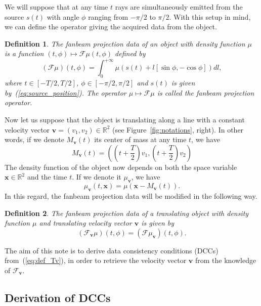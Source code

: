 \documentclass[twocolumn]{IEEEtran}
\numberwithin{equation}{section}
\newcommand{\R}{\mathbb{R}}
\newcommand{\bx}{\mathbf{x}}
\newcommand{\bv}{\mathbf{v}}
\newcommand{\Mbv}{M_{\mathbf{v}}}
\newcommand{\Tbv}{\mathcal{F}_{\mathbf{v}}}
\newcommand{\mubv}{\mu_{\mathbf{v}}}
\newtheorem{definition}{Definition}
\begin{document}
We will suppose that at any time $t$ rays are simultaneously emitted from the source $s(t)$ with angle $\phi$ ranging from $-\pi/2$ to $\pi/2$. With this setup in mind, we can define the operator giving the acquired data from the object.
\begin{definition}
The \emph{fanbeam projection data} of an object with density function $\mu$ is a function $(t,\phi) \mapsto \mathcal{F}\mu(t,\phi)$ defined by
\begin{equation}
	(\mathcal{F}\mu)(t,\phi) = \int_0^{+\infty} \mu \left( s(t) + l \left[ \sin \phi, -\cos \phi \right] \right) dl,
\end{equation}
where $t \in \left[ -T/2, T/2\right]$, $\phi \in \left[ -\pi/2, \pi/2\right]$ and $s(t)$ is given by~(\ref{eq:source_position}). The operator $\mu \mapsto \mathcal{F}\mu$ is called the \emph{fanbeam projection operator}.
\end{definition}


Now let us suppose that the object is translating along a line with a constant velocity vector $\bv = (v_1, v_2)\in \R^2$ (see Figure~\ref{fig:notations}, right). In other words, if we denote $\Mbv(t)$ its center of mass at any time $t$, we have
\begin{equation}
	\Mbv(t) =  \left( \left( t + \frac{T}{2} \right)v_1, \left( t + \frac{T}{2} \right)v_2 \right)
\label{eq:center_of_mass}
\end{equation}
The density function of the object now depends on both the space variable $\bx \in \R^2$ and the time $t$. If we denote it $\mubv$, we have
\begin{equation}
	\mubv(t,\bx) = \mu\left( \bx - \Mbv(t)\right).
\end{equation}
In this regard, the fanbeam projection data will be modified in the following way.
\begin{definition}
The \emph{fanbeam projection data of a translating object} with density function $\mu$ and translating velocity vector $\bv$ is given by
\begin{equation}
	(\Tbv\mu)(t,\phi) =  ( \mathcal{F} \mubv ) (t,\phi).
\label{eq:def_Tv}
\end{equation}
\end{definition}

The aim of this note is to derive data consistency conditions (DCCs) from~(\ref{eq:def_Tv}), in order to retrieve the velocity vector $\bv$ from the knowledge of $\Tbv$.

\subsection{Derivation of DCCs}
\end{document}
